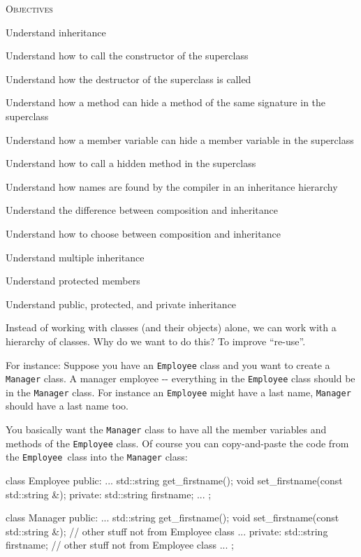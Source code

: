 \newpage{}

\textsc{Objectives}

\begin{tightlist}
\item
  Understand inheritance
\item
  Understand how to call the constructor of the superclass
\item
  Understand how the destructor of the superclass is called
\item
  Understand how a method can hide a method of the same signature in the
  superclass
\item
  Understand how a member variable can hide a member variable in the
  superclass
\item
  Understand how to call a hidden method in the superclass
\item
  Understand how names are found by the compiler in an inheritance
  hierarchy
\item
  Understand the difference between composition and inheritance
\item
  Understand how to choose between composition and inheritance
\item
  Understand multiple inheritance
\item
  Understand protected members
\item
  Understand public, protected, and private inheritance
\end{tightlist}

\newpage{}

Instead of working with classes (and their objects) alone, we can work
with a hierarchy of classes. Why do we want to do this? To improve
``re-use''.

For instance: Suppose you have an \texttt{Employee} class and you want to
create a \texttt{Manager} class. A manager  employee -\/-
everything in the \texttt{Employee} class should be in the \texttt{Manager}
class. For instance an \texttt{Employee} might have a last name,
\texttt{Manager} should have a last name too.

You basically want the \texttt{Manager} class to have all the member
variables and methods of the \texttt{Employee} class. Of course you can
copy-and-paste the code from the \texttt{Employee }class into the
\texttt{Manager} class:
\begin{console}
class Employee
{
public:
        ...
        std::string get_firstname();
        void set_firstname(const std::string &);
private:
        std::string firstname;
        ...
};

class Manager
{
public:
        ...
        std::string get_firstname();
        void set_firstname(const std::string &);
        // other stuff not from Employee class
        ...
private:
        std::string firstname;
        // other stuff not from Employee class
        ...
}; 
\end{console}

